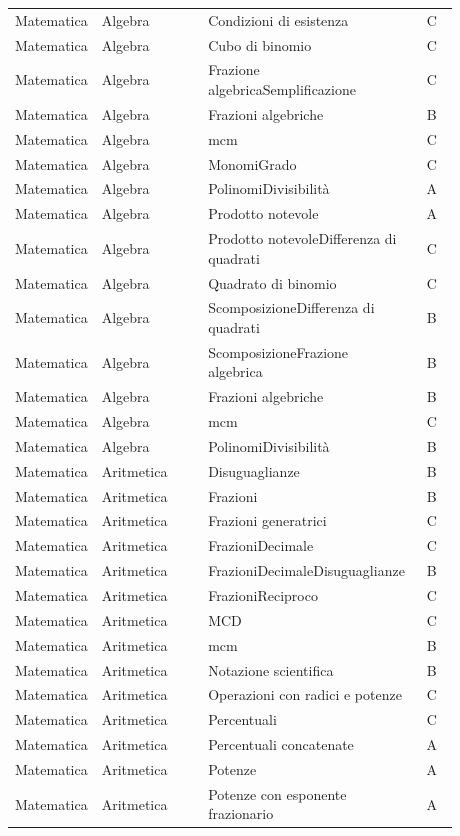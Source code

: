 \documentclass[20pt, a4paper]{article}
\begin{document}
\begin{longtable}{@{}>{\raggedright\arraybackslash}p{0.18\linewidth}>{\raggedright\arraybackslash}p{0.24\linewidth}>{\raggedright\arraybackslash}p{0.46\linewidth}c@{}}
Matematica & Algebra & Condizioni di esistenza & C \\
Matematica & Algebra & Cubo di binomio & C \\
Matematica & Algebra & Frazione algebricaSemplificazione & C \\
Matematica & Algebra & Frazioni algebriche & B \\
Matematica & Algebra & mcm & C \\
Matematica & Algebra & MonomiGrado & C \\
Matematica & Algebra & PolinomiDivisibilità & A \\
Matematica & Algebra & Prodotto notevole & A \\
Matematica & Algebra & Prodotto notevoleDifferenza di quadrati & C \\
Matematica & Algebra & Quadrato di binomio & C \\
Matematica & Algebra & ScomposizioneDifferenza di quadrati & B \\
Matematica & Algebra & ScomposizioneFrazione algebrica & B \\
Matematica & Algebra & Frazioni algebriche & B \\
Matematica & Algebra & mcm & C \\
Matematica & Algebra & PolinomiDivisibilità & B \\
Matematica & Aritmetica & Disuguaglianze & B \\
Matematica & Aritmetica & Frazioni & B \\
Matematica & Aritmetica & Frazioni generatrici & C \\
Matematica & Aritmetica & FrazioniDecimale & C \\
Matematica & Aritmetica & FrazioniDecimaleDisuguaglianze & B \\
Matematica & Aritmetica & FrazioniReciproco & C \\
Matematica & Aritmetica & MCD & C \\
Matematica & Aritmetica & mcm & B \\
Matematica & Aritmetica & Notazione scientifica & B \\
Matematica & Aritmetica & Operazioni con radici e potenze & C \\
Matematica & Aritmetica & Percentuali & C \\
Matematica & Aritmetica & Percentuali concatenate & A \\
Matematica & Aritmetica & Potenze & A \\
Matematica & Aritmetica & Potenze con esponente frazionario & A \\

\end{longtable}
\end{document}
